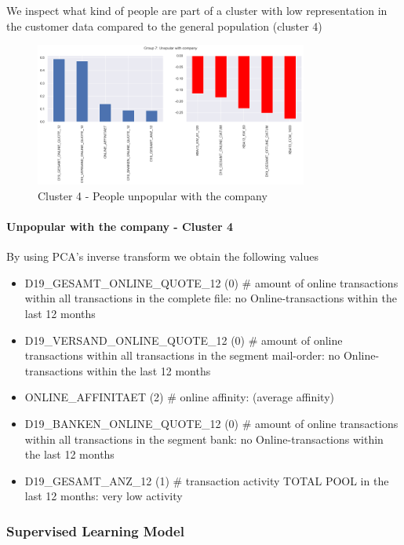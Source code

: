 We inspect what kind of people are part of a cluster with low representation in the customer data compared to the general population (cluster 4)

\begin{figure}[h]
\centering
\includegraphics[width=0.8\textwidth, height=0.4\textwidth]{images/under_cluster.png}
\caption{Cluster 4 - People unpopular with the company }
\label{fig:undercluster}
\end{figure}

\paragraph{Unpopular with the company - Cluster 4} By using PCA's inverse transform we obtain the following values
\begin{itemize}
    \item D19\_GESAMT\_ONLINE\_QUOTE\_12 (0) \# amount of online transactions within all transactions in the complete file: no Online-transactions within the last 12 months
    \item D19\_VERSAND\_ONLINE\_QUOTE\_12 (0) \# amount of online transactions within all transactions in the segment mail-order: no Online-transactions within the last 12 months
    \item ONLINE\_AFFINITAET (2) \# online affinity: (average affinity)
    \item D19\_BANKEN\_ONLINE\_QUOTE\_12 (0) \# amount of online transactions within all transactions in the segment bank: no Online-transactions within the last 12 months
    \item D19\_GESAMT\_ANZ\_12 (1) \# transaction activity TOTAL POOL in the last 12 months: very low activity
\end{itemize}

\subsubsection{Supervised Learning Model}

